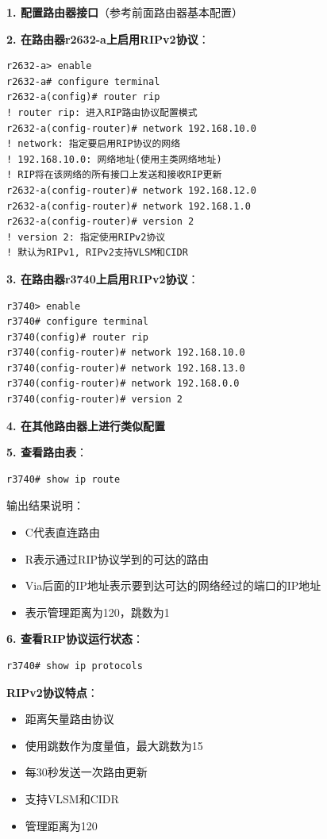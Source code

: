 \documentclass[12pt,a4paper]{ctexart}
\begin{document}
\begin{cmdbox}
\textbf{1. 配置路由器接口}（参考前面路由器基本配置）

\textbf{2. 在路由器r2632-a上启用RIPv2协议}：
\begin{lstlisting}
r2632-a> enable
r2632-a# configure terminal
r2632-a(config)# router rip
! router rip: 进入RIP路由协议配置模式
r2632-a(config-router)# network 192.168.10.0
! network: 指定要启用RIP协议的网络
! 192.168.10.0: 网络地址(使用主类网络地址)
! RIP将在该网络的所有接口上发送和接收RIP更新
r2632-a(config-router)# network 192.168.12.0
r2632-a(config-router)# network 192.168.1.0
r2632-a(config-router)# version 2
! version 2: 指定使用RIPv2协议
! 默认为RIPv1, RIPv2支持VLSM和CIDR
\end{lstlisting}

\textbf{3. 在路由器r3740上启用RIPv2协议}：
\begin{lstlisting}
r3740> enable
r3740# configure terminal
r3740(config)# router rip
r3740(config-router)# network 192.168.10.0
r3740(config-router)# network 192.168.13.0
r3740(config-router)# network 192.168.0.0
r3740(config-router)# version 2
\end{lstlisting}

\textbf{4. 在其他路由器上进行类似配置}

\textbf{5. 查看路由表}：
\begin{lstlisting}
r3740# show ip route
\end{lstlisting}

输出结果说明：
\begin{itemize}[itemsep=0pt]
    \item C代表直连路由
    \item R表示通过RIP协议学到的可达的路由
    \item Via后面的IP地址表示要到达可达的网络经过的端口的IP地址
    \item [120/1]表示管理距离为120，跳数为1
\end{itemize}

\textbf{6. 查看RIP协议运行状态}：
\begin{lstlisting}
r3740# show ip protocols
\end{lstlisting}
\end{cmdbox}

\begin{keybox}
\textbf{RIPv2协议特点}：

\begin{itemize}[itemsep=0pt]
    \item 距离矢量路由协议
    \item 使用跳数作为度量值，最大跳数为15
    \item 每30秒发送一次路由更新
    \item 支持VLSM和CIDR
    \item 管理距离为120
\end{itemize}
\end{keybox}
\end{document}
